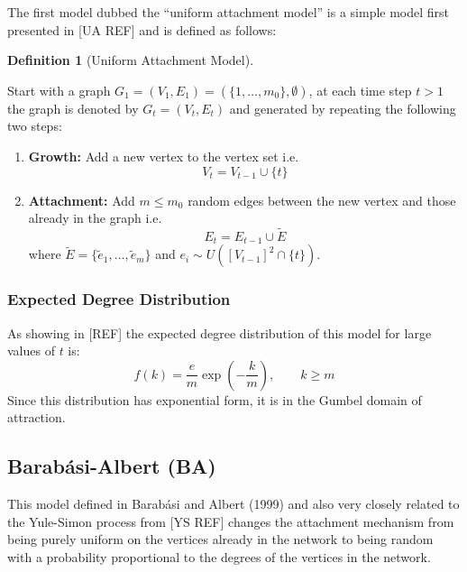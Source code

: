 \documentclass[
  10pt,
  a4paper,
]{scrreprt}
\providecommand{\tightlist}{%
  \setlength{\itemsep}{0pt}\setlength{\parskip}{0pt}}\usepackage{longtable,booktabs,array}
\theoremstyle{plain}
\theoremstyle{definition}
\newtheorem{definition}{Definition}[section]
\theoremstyle{remark}
\begin{document}
{The first model dubbed the ``uniform attachment model'' is a simple
model first presented in {[}UA REF{]} and is defined as follows:

\begin{definition}[Uniform Attachment
Model]\protect\hypertarget{def-ua}{}\label{def-ua}

Start with a graph \(G_1 = (V_1, E_1) = (\{1,\ldots,m_0\}, \emptyset)\),
at each time step \(t>1\) the graph is denoted by \(G_t=(V_t, E_t)\) and
generated by repeating the following two steps:

\begin{enumerate}
\def\labelenumi{\arabic{enumi}.}
\tightlist
\item
  \textbf{Growth:} Add a new vertex to the vertex set i.e.~ \[
  V_t=V_{t-1}\cup\{t\}
  \]
\item
  \textbf{Attachment:} Add \(m\le m_0\) random edges between the new
  vertex and those already in the graph i.e.~ \[
  E_t = E_{t-1} \cup \tilde E
  \] where \(\tilde E = \{\tilde e_1,\ldots, \tilde e_m\}\) and
  \(e_i \sim U([V_{t-1}]^2 \cap \{t\})\).
\end{enumerate}

\end{definition}

\hypertarget{expected-degree-distribution}{%
\subsubsection{Expected Degree
Distribution}\label{expected-degree-distribution}}

As showing in {[}REF{]} the expected degree distribution of this model
for large values of \(t\) is: \[
f(k) = \frac{e}{m}\exp\left(-\frac{k}{m}\right),\qquad k \ge m
\] Since this distribution has exponential form, it is in the Gumbel
domain of attraction.

\hypertarget{barabuxe1si-albert-ba}{%
\subsection{Barabási-Albert (BA)}\label{barabuxe1si-albert-ba}}

This model defined in Barabási and Albert (1999) and also very closely
related to the Yule-Simon process from {[}YS REF{]} changes the
attachment mechanism from being purely uniform on the vertices already
in the network to being random with a probability proportional to the
degrees of the vertices in the network.

}
\end{document}
